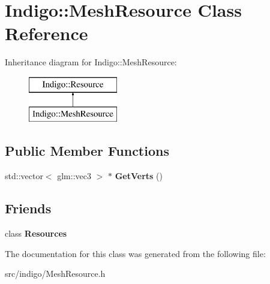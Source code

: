 \hypertarget{class_indigo_1_1_mesh_resource}{}\section{Indigo\+:\+:Mesh\+Resource Class Reference}
\label{class_indigo_1_1_mesh_resource}
Inheritance diagram for Indigo\+:\+:Mesh\+Resource\+:\begin{figure}[H]
\begin{center}
\leavevmode
\includegraphics[height=2.000000cm]{class_indigo_1_1_mesh_resource}
\end{center}
\end{figure}
\subsection*{Public Member Functions}
\begin{DoxyCompactItemize}
\item 
\mbox{\label{class_indigo_1_1_mesh_resource_a20f924a8ad2ae2618e049ad00a46ea30}} 
std\+::vector$<$ glm\+::vec3 $>$ $\ast$ {\bfseries Get\+Verts} ()
\end{DoxyCompactItemize}
\subsection*{Friends}
\begin{DoxyCompactItemize}
\item 
\mbox{\label{class_indigo_1_1_mesh_resource_a74b3f77e4a7285c624d30192f9643876}} 
class {\bfseries Resources}
\end{DoxyCompactItemize}


The documentation for this class was generated from the following file\+:\begin{DoxyCompactItemize}
\item 
src/indigo/Mesh\+Resource.\+h\end{DoxyCompactItemize}
